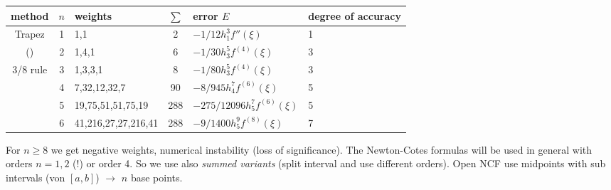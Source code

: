   \begin{landscape}
    \begin{tabularx}{\linewidth}{|c|c|Y|c|Y|Y|} %
      \hline
      method & $n$ & weights & $\sum$ & error $E$ & degree of accuracy \\
      \hline
      Trapez & 1 & 1,1 & 2 & $-1/12 h_1^3 f''(\xi)$ & 1\\
       () & 2 & 1,4,1 & 6 & $-1/30 h_3^5 f^(4)(\xi)$ & 3\\
      3/8 rule & 3 & 1,3,3,1 & 8 & $-1/80 h_3^5 f^(4)(\xi)$ & 3\\
       & 4 & 7,32,12,32,7 & 90 & $-8/945 h_4^7 f^(6)(\xi)$ & 5\\
       & 5 & 19,75,51,51,75,19 & 288 & $-275/12096 h_5^7 f^(6)(\xi)$ & 5\\
       & 6 & 41,216,27,27,216,41 & 288 & $-9/1400 h_5^9 f^(8)(\xi)$ & 7\\ \hline
    \end{tabularx}
	\begin{*remark}
		For $n \ge 8$ we get negative weights, numerical instability (loss of significance). The Newton-Cotes formulas will be used in general with orders $n=1,2$ (!) or order 4. So we use also \emph{summed variants} (split interval and use different orders). Open NCF use midpoints with sub intervals (von $[a,b]$) $\to$ $n$ base points.
	\end{*remark}
	\begin{*example}
	\end{*example}
  \end{landscape}